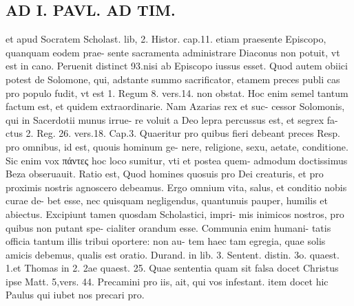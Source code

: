 \documentclass{article}
\begin{document}
\begin{pages}
\section*{AD I. PAVL. AD TIM. }
\marginpar{[ p.44 ]}\pstart et apud Socratem Scholast. lib, 2. Histor. cap.11. etiam praesente Episcopo, quanquam eodem prae- sente sacramenta administrare Diaconus non potuit, vt est in cano. Peruenit distinct 93.nisi ab Episcopo iussus esset. Quod autem obiici potest de Solomone, qui, adstante summo sacrificator, etamem preces publi cas pro populo fudit, vt est 1. Regum 8. vers.14. non obstat. Hoc enim semel tantum factum est, et quidem extraordinarie. Nam Azarias rex et suc- cessor Solomonis, qui in Sacerdotii munus irrue- re voluit a Deo lepra percussus est, et segrex fa- ctus 2. Reg. 26. vers.18. Cap.3. Quaeritur pro quibus fieri debeant preces Resp. pro omnibus, id est, quouis hominum ge- nere, religione, sexu, aetate, conditione. Sic enim vox πάντες hoc loco sumitur, vti et postea quem- admodum doctissimus Beza obseruauit. Ratio est, Quod homines quosuis pro Dei creaturis, et pro proximis nostris agnoscero debeamus. Ergo omnium vita, salus, et conditio nobis curae de- bet esse, nec quisquam negligendus, quantunuis pauper, humilis et abiectus. Excipiunt tamen quosdam Scholastici, impri- mis inimicos nostros, pro quibus non putant spe- cialiter orandum esse. Communia enim humani- tatis officia tantum illis tribui oportere: non au- tem haec tam egregia, quae solis amicis debemus, qualis est oratio. Durand. in lib. 3. Sentent. distin. 3o. quaest. 1.et Thomas in 2. 2ae quaest. 25. Quae sententia quam sit falsa docet Christus ipse Matt. 5,vers. 44. Precamini pro iis, ait, qui vos infestant. item docet hic Paulus qui iubet nos precari pro.  \pend

\end{pages}
\end{document}
